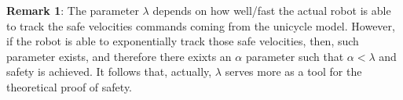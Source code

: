 \textbf{Remark 1}: The parameter $\lambda$ depends on how well/fast the actual robot is able to track the safe velocities commands coming from the unicycle model. However, if the robot is able to exponentially track those safe velocities, then, such parameter exists, and therefore there exixts an $\alpha$ parameter such that $\alpha <\lambda$ and safety is achieved. It follows that, actually, $\lambda$ serves more as a tool for the theoretical proof of safety.